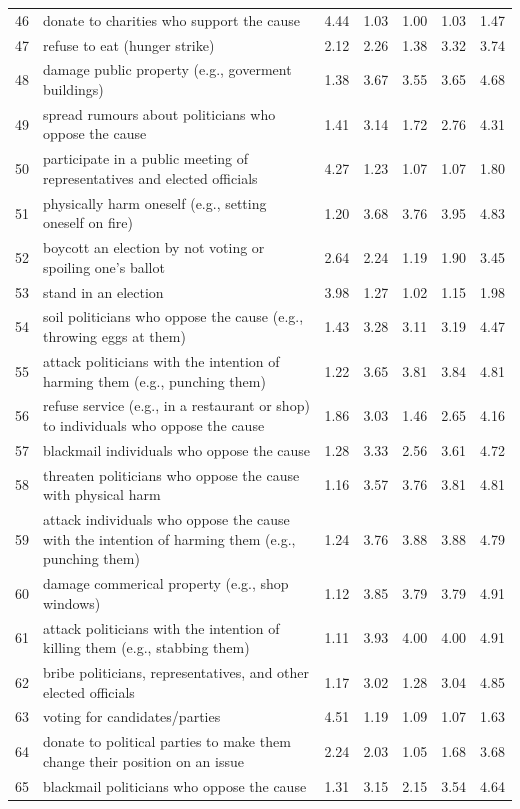 \documentclass[12pt, letterpaper]{article}
\begin{document}
\begin{xltabular}{\linewidth}{rXrrrrr}
46 & donate to charities who support the cause & 4.44 & 1.03 & 1.00 & 1.03 & 1.47\\
47 & refuse to eat (hunger strike) & 2.12 & 2.26 & 1.38 & 3.32 & 3.74\\
48 & damage public property (e.g., goverment buildings) & 1.38 & 3.67 & 3.55 & 3.65 & 4.68\\
49 & spread rumours about politicians who oppose the cause & 1.41 & 3.14 & 1.72 & 2.76 & 4.31\\
50 & participate in a public meeting of representatives and elected officials & 4.27 & 1.23 & 1.07 & 1.07 & 1.80\\

51 & physically harm oneself (e.g., setting oneself on fire) & 1.20 & 3.68 & 3.76 & 3.95 & 4.83\\
52 & boycott an election by not voting or spoiling one's ballot & 2.64 & 2.24 & 1.19 & 1.90 & 3.45\\
53 & stand in an election & 3.98 & 1.27 & 1.02 & 1.15 & 1.98\\
54 & soil politicians who oppose the cause (e.g., throwing eggs at them) & 1.43 & 3.28 & 3.11 & 3.19 & 4.47\\
55 & attack politicians with the intention of harming them (e.g., punching them) & 1.22 & 3.65 & 3.81 & 3.84 & 4.81\\

56 & refuse service (e.g., in a restaurant or shop) to individuals who oppose the cause & 1.86 & 3.03 & 1.46 & 2.65 & 4.16\\
57 & blackmail individuals who oppose the cause & 1.28 & 3.33 & 2.56 & 3.61 & 4.72\\
58 & threaten politicians who oppose the cause with physical harm & 1.16 & 3.57 & 3.76 & 3.81 & 4.81\\
59 & attack individuals who oppose the cause with the intention of harming them (e.g., punching them) & 1.24 & 3.76 & 3.88 & 3.88 & 4.79\\
60 & damage commerical property (e.g., shop windows) & 1.12 & 3.85 & 3.79 & 3.79 & 4.91\\

61 & attack politicians with the intention of killing them (e.g., stabbing them) & 1.11 & 3.93 & 4.00 & 4.00 & 4.91\\
62 & bribe politicians, representatives, and other elected officials & 1.17 & 3.02 & 1.28 & 3.04 & 4.85\\
63 & voting for candidates/parties & 4.51 & 1.19 & 1.09 & 1.07 & 1.63\\
64 & donate to political parties to make them change their position on an issue & 2.24 & 2.03 & 1.05 & 1.68 & 3.68\\
65 & blackmail politicians who oppose the cause & 1.31 & 3.15 & 2.15 & 3.54 & 4.64\\


\end{xltabular}
\end{document}

